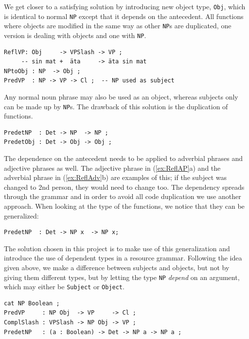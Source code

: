 \documentclass{report}
\begin{document}
We get closer to a satisfying solution by introducing new object type,
\verb_Obj_, which is
identical to normal \verb_NP_ except that it depends on 
the antecedent. All functions where objects are modified in the same way
as other \verb-NP-s are duplicated, one version is dealing 
with objects and one with \verb-NP-.
\begin{verbatim}
ReflVP: Obj     -> VPSlash -> VP ;
     -- sin mat +  äta     -> äta sin mat 
NPtoObj : NP  -> Obj ;
PredVP  : NP -> VP -> Cl ;  -- NP used as subject
\end{verbatim}
Any normal noun phrase may also be used as an object, whereas subjects only
can be made up by \verb-NP-s.
The drawback of this solution is the duplication of functions.
\begin{verbatim}
PredetNP  : Det -> NP  -> NP ;
PredetObj : Det -> Obj -> Obj ;
\end{verbatim}
The dependence on the antecedent needs to be applied to adverbial phrases and
adjective phrases as well. The adjective phrase in (\ref{ex:ReflAP}a) and
the adverbial phrase in (\ref{ex:ReflAdv}b) are examples of this; if the
subject was changed to 2nd person, they  would need to change too.
 \label{ex:ReflAP2} \label{ex:ReflAdv2}
The dependency spreads through the grammar and in order to avoid all code
duplication we use another approach.
When looking at the type of
the functions, we notice that they can be generalized:
\begin{verbatim}
PredetNP  : Det -> NP x  -> NP x;
\end{verbatim}
The solution chosen in this project is to make use of this generalization and
introduce the use of dependent types in a resource grammar.
Following the idea given above, we make a difference between subjects and objects, but not
by giving them different types, but by %
letting the type \verb-NP- \textit{depend} on an argument, which may either be \verb-Subject- or
\verb-Object-.
\begin{verbatim}
cat NP Boolean ;
PredVP     : NP Obj  -> VP     -> Cl ;
ComplSlash : VPSlash -> NP Obj -> VP ;
PredetNP   : (a : Boolean) -> Det -> NP a -> NP a ;
\end{verbatim}
\end{document}
